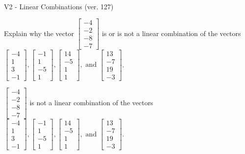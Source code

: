 \begin{exercise}
  \begin{exerciseTitle}V2 - Linear Combinations (ver. 127)\end{exerciseTitle}
  \begin{exerciseStatement}
    Explain why the vector \(\left[\begin{array}{c}
-4 \\
-2 \\
-8 \\
-7
\end{array}\right]\)  is or is not a linear 
	combination of the vectors \(\left[\begin{array}{c}
-4 \\
1 \\
3 \\
-1
\end{array}\right] , \left[\begin{array}{c}
-1 \\
1 \\
-5 \\
1
\end{array}\right] , \left[\begin{array}{c}
14 \\
-5 \\
1 \\
1
\end{array}\right] , \text{ and } \left[\begin{array}{c}
13 \\
-7 \\
19 \\
-3
\end{array}\right]\).
	


  \end{exerciseStatement}
  \begin{exerciseAnswer}
   \(\left[\begin{array}{c}
-4 \\
-2 \\
-8 \\
-7
\end{array}\right]\) 
  	 is not  
	a linear combination of the vectors \(\left[\begin{array}{c}
-4 \\
1 \\
3 \\
-1
\end{array}\right] , \left[\begin{array}{c}
-1 \\
1 \\
-5 \\
1
\end{array}\right] , \left[\begin{array}{c}
14 \\
-5 \\
1 \\
1
\end{array}\right] , \text{ and } \left[\begin{array}{c}
13 \\
-7 \\
19 \\
-3
\end{array}\right]\).


\end{exerciseAnswer}
\end{exercise}
